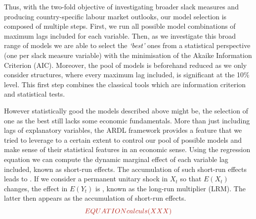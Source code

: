 Thus, with the two-fold objective of investigating broader slack measures and producing country-specific labour market outlooks, our model selection is composed of multiple steps. 
First, we run all possible model combinations of maximum lags included for each variable. 
Then, as we investigate this broad range of models we are able to select the \textit{‘best’} ones from a statistical perspective (one per slack measure variable) with the minimisation of the Akaike Information Criterion (AIC). 
Moreover, the pool of models is beforehand reduced as we only consider structures, where every maximum lag included, is significant at the 10\% level. 
This first step combines the classical tools which are information criterion and statistical tests.

However statistically good the models described above might be, the selection of one as the best still lacks some economic fundamentals. 
More than just including lags of explanatory variables, the ARDL framework provides a feature that we tried to leverage to a certain extent to control our pool of possible models and make sense of their statistical features in an economic sense. 
Using the regression equation we can compute the dynamic marginal effect of each variable lag included, known as short-run effects. 
The accumulation of such short-run effects leads to . 
If we consider a permanent unitary shock in $X_{t}$ so that $E(X_{t})$ changes, the effect in $E(Y_{t})$ is , known as the long-run multiplier (LRM). The latter then appears as the accumulation of short-run effects. 
\vspace{-0.3cm}
\begin{equation*}
    \red{EQUATION calculs (XXX)}
\end{equation*}

